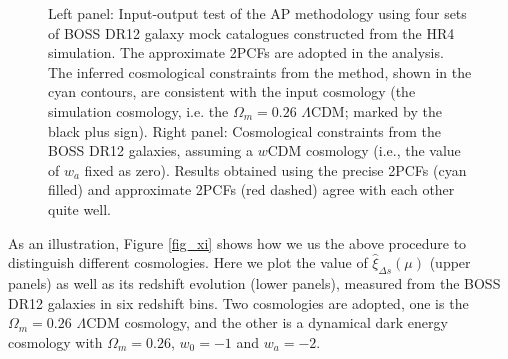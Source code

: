 \documentclass[iop]{emulateapj}
\begin{document}
\begin{figure}
   \caption{\label{fig_Check}
 Left panel: Input-output test of the AP methodology using four sets of BOSS DR12 galaxy mock catalogues constructed from the HR4 simulation.
 The approximate 2PCFs are adopted in the analysis.
 The inferred cosmological constraints from the method, shown in the cyan contours, are consistent with the input cosmology
 (the simulation cosmology, i.e. the $\Omega_m=0.26$ $\Lambda$CDM; marked by the black plus sign).
 Right panel: Cosmological constraints from the BOSS DR12 galaxies, assuming a $w$CDM cosmology 
 (i.e., the value of $w_a$ fixed as zero).
 Results obtained using the precise 2PCFs (cyan filled) 
 and approximate 2PCFs (red dashed) agree with each other quite well.
   }
\end{figure}

As an illustration,
Figure \ref{fig_xi} shows how we us the above procedure to distinguish different cosmologies.
Here we plot the value of $\hat\xi_{\Delta s}(\mu)$ (upper panels) as well as its redshift evolution (lower panels), 
measured from the BOSS DR12 galaxies in six redshift bins.
Two cosmologies are adopted, 
one is the $\Omega_m=0.26$ $\Lambda$CDM cosmology, 
and the other is a dynamical dark energy cosmology with $\Omega_m=0.26$, $w_0=-1$ and $w_a=-2$.
\end{document}
